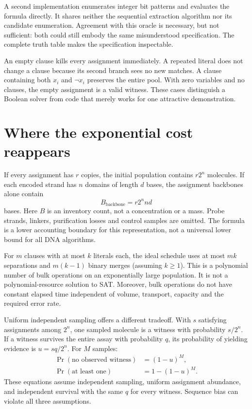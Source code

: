 A second implementation enumerates integer bit patterns and evaluates the
formula directly. It shares neither the sequential extraction algorithm
nor its candidate enumeration. Agreement with this oracle is necessary,
but not sufficient: both could still embody the same misunderstood
specification. The complete truth table makes the specification inspectable.

\begin{center}\end{center}

An empty clause kills every assignment immediately. A repeated literal
does not change a clause because its second branch sees no new matches.
A clause containing both $x_i$ and $\neg x_i$ preserves the entire pool.
With zero variables and no clauses, the empty assignment is a valid witness.
These cases distinguish a Boolean solver from code that merely works for
one attractive demonstration.

\section{Where the exponential cost reappears}
If every assignment has $r$ copies, the initial population contains
$r2^n$ molecules. If each encoded strand has $n$ domains of length $d$
bases, the assignment backbones alone contain
\begin{equation}
 B_{\mathrm{backbone}}=r2^n nd
\end{equation}
bases. Here $B$ is an inventory count, not a concentration or a mass.
Probe strands, linkers, purification losses and control samples are omitted.
The formula is a lower accounting boundary for this representation, not
a universal lower bound for all DNA algorithms.

For $m$ clauses with at most $k$ literals each, the ideal schedule uses at
most $mk$ separations and $m(k-1)$ binary merges (assuming $k\geq1$).
This is a polynomial number of bulk operations on an exponentially large
population. It is not a polynomial-resource solution to SAT. Moreover, bulk
operations do not have constant elapsed time independent of volume,
transport, capacity and the required error rate.

Uniform independent sampling offers a different tradeoff. With $s$
satisfying assignments among $2^n$, one sampled molecule is a witness with
probability $s/2^n$. If a witness survives the entire assay with probability
$q$, its probability of yielding evidence is $u=sq/2^n$. For $M$ samples:
\begin{align}
 \Pr(\text{no observed witness})&=(1-u)^M,\\
 \Pr(\text{at least one})&=1-(1-u)^M.
 \label{eq:coverage}
\end{align}
These equations assume independent sampling, uniform assignment abundance,
and independent survival with the same $q$ for every witness. Sequence bias
can violate all three assumptions.

